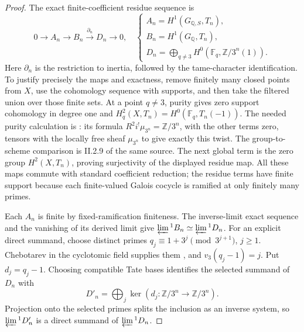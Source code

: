 \begin{proof}
The exact finite-coefficient residue sequence is
\[
 0\longrightarrow A_n
   \longrightarrow B_n
   \xrightarrow{\partial_n}D_n\longrightarrow0,
 \quad
 \begin{cases}
 A_n=H^1(G_{\mathbb Q,S},T_n),\\
 B_n=H^1(G_{\mathbb Q},T_n),\\
 D_n=\displaystyle\bigoplus_{q\ne3}
                   H^0(\mathbb F_q,\mathbb Z/3^n(1)).
 \end{cases}
\]
Here \(\partial_n\) is the restriction to inertia, followed
by the tame-character identification. To justify precisely
the maps and exactness, remove finitely many closed points
from \(X\), use the cohomology sequence with supports, and
then take the filtered union over those finite sets. At a
point \(q\ne3\), purity gives zero support cohomology in
degree one and
\(H^2_q(X,T_n)=H^0(\mathbb F_q,T_n(-1))\).
The needed purity calculation is
\cite[II.1.7(b)]{GhostMilneADT}: its formula
\(R^2i^!\mu_{3^n}=\mathbb Z/3^n\), with the other terms
zero, tensors with the locally free sheaf \(\mu_{3^n}\)
to give exactly this twist. The group-to-scheme comparison
is II.2.9 of the same source. The next global term is the
zero group \(H^2(X,T_n)\), proving surjectivity of the
displayed residue map. All these maps commute with standard
coefficient reduction; the residue terms have finite support
because each finite-valued Galois cocycle is ramified at
only finitely many primes.

Each \(A_n\) is finite by fixed-ramification finiteness.
The inverse-limit exact sequence and the vanishing of its
derived limit give
\(\varprojlim{}^1 B_n\simeq\varprojlim{}^1D_n\).
For an explicit direct summand, choose distinct primes
\(q_j\equiv1+3^j\pmod{3^{j+1}}\), \(j\geq1\).
Chebotarev in the cyclotomic field supplies them
\cite[Theorem~8.31]{GhostMilneANT}, and
\(v_3(q_j-1)=j\). Put \(d_j=q_j-1\).
Choosing compatible Tate bases identifies the selected
summand of \(D_n\) with
\[
 D'_n=\bigoplus_j
   \ker(d_j:\mathbb Z/3^n\longrightarrow\mathbb Z/3^n).
\]
Projection onto the selected primes splits the inclusion
as an inverse system, so \(\varprojlim{}^1D'_n\) is a
direct summand of \(\varprojlim{}^1D_n\).


\end{proof}

